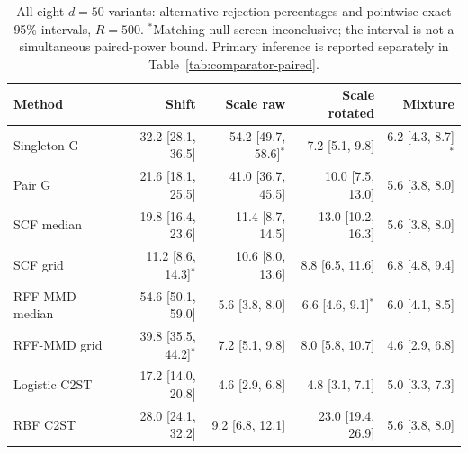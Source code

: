 {\color{blue}
\begin{table}[t]
\color{blue}
\centering
\small
\caption{All eight $d=50$ variants: alternative rejection percentages and pointwise exact 95\% intervals, $R=500$. $^{*}$Matching null screen inconclusive; the interval is not a simultaneous paired-power bound. Primary inference is reported separately in Table~\ref{tab:comparator-paired}.}
\label{tab:comparator-power-d50}
\setlength{\tabcolsep}{8pt}
\renewcommand{\arraystretch}{1.2}
\begin{tabular}{lrrrr}
\toprule
Method & Shift & Scale raw & Scale rotated & Mixture\\
\midrule
Singleton G & 32.2 [28.1, 36.5] & 54.2 [49.7, 58.6]$^{*}$ & 7.2 [5.1, 9.8] & 6.2 [4.3, 8.7]$^{*}$ \\
Pair G & 21.6 [18.1, 25.5] & 41.0 [36.7, 45.5] & 10.0 [7.5, 13.0] & 5.6 [3.8, 8.0] \\
SCF median & 19.8 [16.4, 23.6] & 11.4 [8.7, 14.5] & 13.0 [10.2, 16.3] & 5.6 [3.8, 8.0] \\
SCF grid & 11.2 [8.6, 14.3]$^{*}$ & 10.6 [8.0, 13.6] & 8.8 [6.5, 11.6] & 6.8 [4.8, 9.4] \\
RFF-MMD median & 54.6 [50.1, 59.0] & 5.6 [3.8, 8.0] & 6.6 [4.6, 9.1]$^{*}$ & 6.0 [4.1, 8.5] \\
RFF-MMD grid & 39.8 [35.5, 44.2]$^{*}$ & 7.2 [5.1, 9.8] & 8.0 [5.8, 10.7] & 4.6 [2.9, 6.8] \\
Logistic C2ST & 17.2 [14.0, 20.8] & 4.6 [2.9, 6.8] & 4.8 [3.1, 7.1] & 5.0 [3.3, 7.3] \\
RBF C2ST & 28.0 [24.1, 32.2] & 9.2 [6.8, 12.1] & 23.0 [19.4, 26.9] & 5.6 [3.8, 8.0] \\
\bottomrule
\end{tabular}
\end{table}
}
